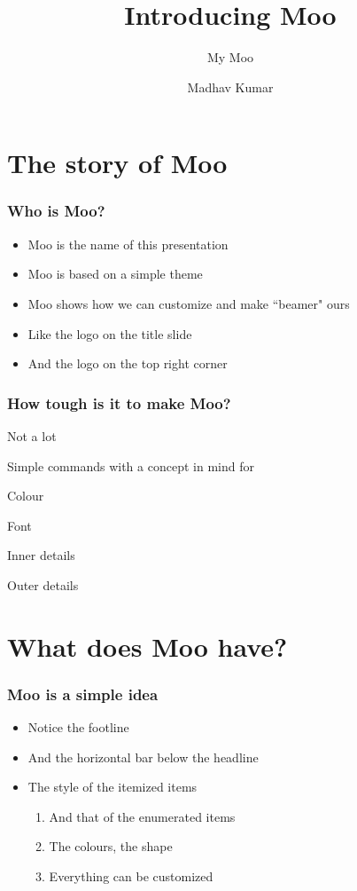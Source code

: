 \documentclass{beamer}
\title{Introducing Moo}
\subtitle{My Moo}
\author{Madhav Kumar}\institute{We think therefore we R}
\newenvironment{wideitemize}{\itemize\addtolength{\itemsep}{10pt}}{\enditemize}
\begin{document}
\begin{frame}[plain]
	\titlepage
\end{frame}



\section{The story of Moo}

\begin{frame}
	\frametitle{Who is Moo?}
		\begin{itemize}
 			\item Moo is the name of this presentation
 			\item Moo is based on a simple theme
 			\item Moo shows how we can customize and make ``beamer" ours
 			\item Like the logo on the title slide
 			\item And the logo on the top right corner
 		\end{itemize}
\end{frame}


\begin{frame}
	\frametitle{How tough is it to make Moo?}
		\begin{wideitemize}
			\item Not a lot
			\item Simple commands with a concept in mind for
			\pause
			\item Colour
			\pause
			\item Font
			\pause
			\item Inner details
			\pause
			\item Outer details
		\end{wideitemize}
\end{frame}



\section{What does Moo have?}



\begin{frame}
	\frametitle{Moo is a simple idea}
		\begin{itemize}
			\item Notice the footline
			\item And the horizontal bar below the headline
			\item The style of the itemized items
				\begin{enumerate}					
					\item And that of the enumerated items
					\item The colours, the shape
					\item Everything can be customized
				\end{enumerate}		
		\end{itemize}
\end{frame}
\end{document}
